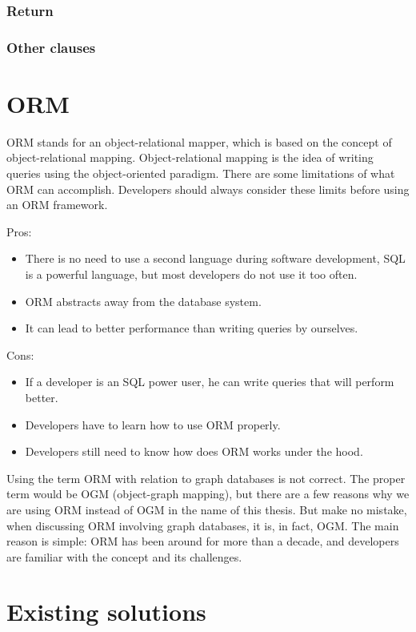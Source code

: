 \subsubsection{Return}
\subsubsection{Other clauses}

\section{ORM}
ORM stands for an object-relational mapper, which is based on the concept of object-relational mapping. Object-relational mapping is the idea of writing queries using the object-oriented paradigm.
There are some limitations of what ORM can accomplish. Developers should always consider these limits before using an ORM framework. \cite{mario_hoyos_what_2018}

\noindent Pros:
\begin{itemize}
    \item There is no need to use a second language during software development, SQL is a powerful language, but most developers do not use it too often.
    \item ORM abstracts away from the database system.
    \item It can lead to better performance than writing queries by ourselves.
\end{itemize}
Cons:
\begin{itemize}
    \item If a developer is an SQL power user, he can write queries that will perform better.
    \item Developers have to learn how to use ORM properly.
    \item Developers still need to know how does ORM works under the hood.
\end{itemize}

Using the term ORM with relation to graph databases is not correct. The proper term would be OGM (object-graph mapping), but there are a few reasons why we are using ORM instead of OGM in the name of this thesis. But make no mistake, when discussing ORM involving graph databases, it is, in fact, OGM. The main reason is simple: ORM has been around for more than a decade, and developers are familiar with the concept and its challenges.

\section {Existing solutions}

